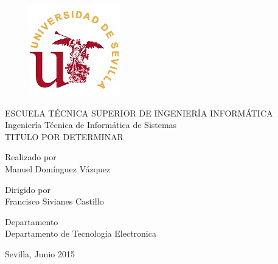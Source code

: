 \begin{titlepage}
\begin{center}
	\begin{figure}[h]
		\centering
			\includegraphics{imagenes/logo_us.jpg}
	\end{figure}
	
	\begin{Large}
	\vspace*{1cm}
	ESCUELA TÉCNICA  SUPERIOR DE  INGENIERÍA  INFORMÁTICA\\
	\vspace*{1cm}
	Ingeniería Técnica de Informática de Sistemas\\
    \vspace*{2cm}
    TITULO POR DETERMINAR\\
	\end{Large}
	\vspace*{2cm}
	Realizado por\\
	Manuel Domínguez Vázquez
	\vspace*{0.5cm}
	
	Dirigido por\\
	Francisco Sivianes Castillo
	\vspace*{0.5cm}
	
	Departamento\\
	Departamento de Tecnologia Electronica\\
\end{center}
	\vspace*{1.5cm}
	\hfill Sevilla, Junio 2015
\end{titlepage}
\cleardoublepage


